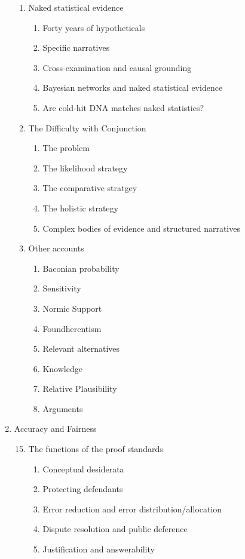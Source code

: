 \documentclass[
  10pt,
  dvipsnames,enabledeprecatedfontcommands]{scrartcl}
\begin{document}
\begin{enumerate}
\begin{enumerate}
\item  Naked statistical evidence
  \begin{enumerate}
  \item  Forty years of hypotheticals
  \item  Specific narratives
  \item  Cross-examination and causal grounding
  \item  Bayesian networks and naked statistical evidence
  \item  Are cold-hit DNA matches naked statistics?
  \end{enumerate}
  
  
\item  The Difficulty with Conjunction
  \begin{enumerate}
  \item  The problem
  \item  The likelihood strategy
  \item  The comparative stratgey
  \item  The holistic strategy
  \item  Complex bodies of evidence and structured narratives
  \end{enumerate}  

 \item  Other accounts 
  \begin{enumerate}
  \item  Baconian probability
  \item  Sensitivity
  \item  Normic Support
  \item  Foundherentism
  \item  Relevant alternatives
  \item  Knowledge
  \item  Relative Plausibility
  \item  Arguments
  \end{enumerate}

\end{enumerate}
\item  Accuracy and Fairness
\begin{enumerate}

\setcounter{enumii}{14}
  \item  The functions of the proof standards
  \begin{enumerate}
  \item  Conceptual desiderata
  \item  Protecting defendants
  \item  Error reduction and error distribution/allocation
  \item  Dispute resolution and public deference
  \item  Justification and answerability
  \end{enumerate}





\end{enumerate}
\end{enumerate}
\end{document}

